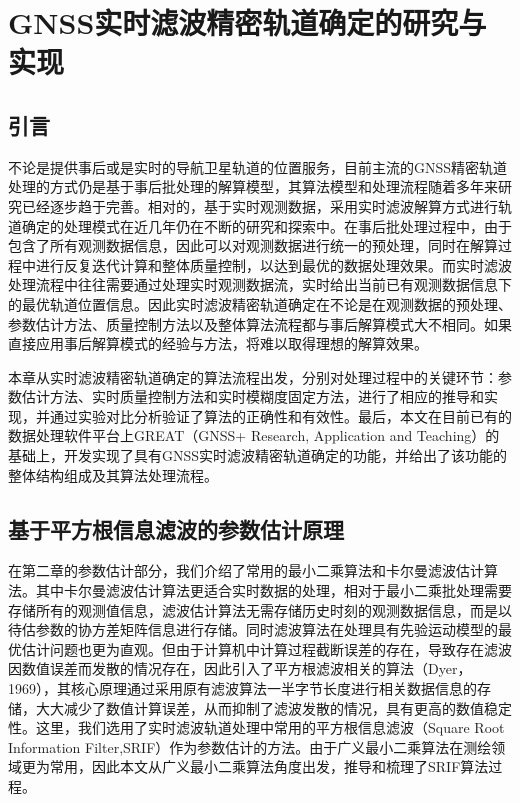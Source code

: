 
\chapter{GNSS实时滤波精密轨道确定的研究与实现}

\section{引言}

不论是提供事后或是实时的导航卫星轨道的位置服务，目前主流的GNSS精密轨道处理的方式仍是基于事后批处理的解算模型，其算法模型和处理流程随着多年来研究已经逐步趋于完善。相对的，基于实时观测数据，采用实时滤波解算方式进行轨道确定的处理模式在近几年仍在不断的研究和探索中。在事后批处理过程中，由于包含了所有观测数据信息，因此可以对观测数据进行统一的预处理，同时在解算过程中进行反复迭代计算和整体质量控制，以达到最优的数据处理效果。而实时滤波处理流程中往往需要通过处理实时观测数据流，实时给出当前已有观测数据信息下的最优轨道位置信息。因此实时滤波精密轨道确定在不论是在观测数据的预处理、参数估计方法、质量控制方法以及整体算法流程都与事后解算模式大不相同。如果直接应用事后解算模式的经验与方法，将难以取得理想的解算效果。

本章从实时滤波精密轨道确定的算法流程出发，分别对处理过程中的关键环节：参数估计方法、实时质量控制方法和实时模糊度固定方法，进行了相应的推导和实现，并通过实验对比分析验证了算法的正确性和有效性。最后，本文在目前已有的数据处理软件平台上GREAT（GNSS+ Research,
Application and Teaching）的基础上，开发实现了具有GNSS实时滤波精密轨道确定的功能，并给出了该功能的整体结构组成及其算法处理流程。

\section{基于平方根信息滤波的参数估计原理}

在第二章的参数估计部分，我们介绍了常用的最小二乘算法和卡尔曼滤波估计算法。其中卡尔曼滤波估计算法更适合实时数据的处理，相对于最小二乘批处理需要存储所有的观测值信息，滤波估计算法无需存储历史时刻的观测数据信息，而是以待估参数的协方差矩阵信息进行存储。同时滤波算法在处理具有先验运动模型的最优估计问题也更为直观。但由于计算机中计算过程截断误差的存在，导致存在滤波因数值误差而发散的情况存在，因此引入了平方根滤波相关的算法（Dyer，1969），其核心原理通过采用原有滤波算法一半字节长度进行相关数据信息的存储，大大减少了数值计算误差，从而抑制了滤波发散的情况，具有更高的数值稳定性。这里，我们选用了实时滤波轨道处理中常用的平方根信息滤波（Square Root Information Filter,SRIF）作为参数估计的方法。由于广义最小二乘算法在测绘领域更为常用，因此本文从广义最小二乘算法角度出发，推导和梳理了SRIF算法过程。

